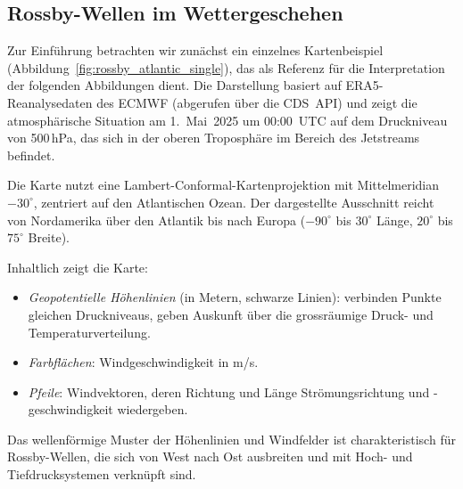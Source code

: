 \subsection{Rossby-Wellen im Wettergeschehen}

Zur Einführung betrachten wir zunächst ein einzelnes Kartenbeispiel
(Abbildung~\ref{fig:rossby_atlantic_single}), das als Referenz für die Interpretation der
folgenden Abbildungen dient.
Die Darstellung basiert auf ERA5-Reanalysedaten des ECMWF (abgerufen über die CDS~API)
%
%
und zeigt die atmosphärische Situation am 1.\ Mai~2025 um 00:00~UTC auf dem Druckniveau
von 500\,hPa, das sich in der oberen Troposphäre im Bereich des Jetstreams befindet.
%


Die Karte nutzt eine Lambert-Conformal-Kartenprojektion mit Mittelmeridian \(-30^\circ\), zentriert auf den Atlantischen Ozean.
%
Der dargestellte Ausschnitt reicht von Nordamerika über den Atlantik bis nach Europa (\(-90^\circ\) bis \(30^\circ\) Länge, \(20^\circ\) bis \(75^\circ\) Breite).
%
%
%
%

Inhaltlich zeigt die Karte:
\begin{itemize}
	\item \emph{Geopotentielle Höhenlinien} (in Metern, schwarze Linien): verbinden Punkte gleichen Druckniveaus, geben Auskunft über die grossräumige Druck- und Temperaturverteilung.
%
	\item \emph{Farbflächen}: Windgeschwindigkeit in m/s.
%
	\item \emph{Pfeile}: Windvektoren, deren Richtung und Länge Strömungsrichtung und -ge\-schwin\-dig\-keit wiedergeben.
\end{itemize}

Das wellenförmige Muster der Höhenlinien und Windfelder ist charakteristisch für Rossby-Wellen, die sich von West nach Ost ausbreiten und mit Hoch- und Tiefdrucksystemen verknüpft sind.

